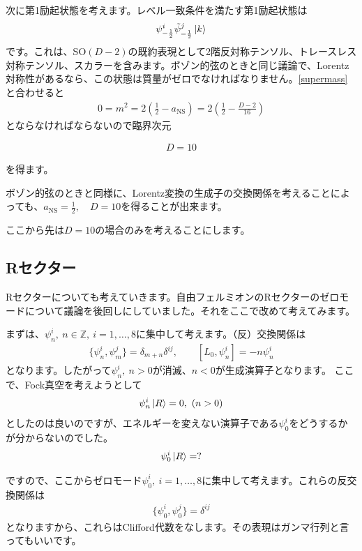\documentclass[report,paper=a4, fontsize=12pt, line_length=16cm, number_of_lines=33,dvipdfmx]{jlreq}
\newenvironment{important}{\begin{tcolorbox}[
  colback = white,
  colframe = red!35,
  boxrule = 2mm,
  fonttitle = \bfseries,
  after = \noindent] }{\end{tcolorbox}}
\numberwithin{equation}{chapter}
\numberwithin{equation}{section}
\newcommand{\Zb}{\mathbb{Z}}
\newcommand{\psit}{\tilde{\psi}}
\newcommand{\aNS}{a_{\mathrm{NS}}}
\begin{document}
次に第1励起状態を考えます。レベル一致条件を満たす第1励起状態は
\begin{align}
  \psi_{-\frac12}^{i}\psit_{-\frac12}^{j}\ket{k}
\end{align}
です。これは、SO$(D-2)$の既約表現として2階反対称テンソル、トレースレス対称テンソル、スカラーを含みます。ボゾン的弦のときと同じ議論で、Lorentz対称性があるなら、この状態は質量がゼロでなければなりません。\eqref{supermass}と合わせると
\begin{align}
  0=m^2=2(\frac12 -\aNS)=2(\frac12 -\frac{D-2}{16})
\end{align}
とならなければならないので臨界次元
\begin{important}
  \begin{align}
    D=10
  \end{align}
\end{important}
を得ます。

ボゾン的弦のときと同様に、Lorentz変換の生成子の交換関係を考えることによっても、$\aNS=\frac12,\quad D=10$を得ることが出来ます。

ここから先は$D=10$の場合のみを考えることにします。

\subsection{Rセクター}
Rセクターについても考えていきます。自由フェルミオンのRセクターのゼロモードについて議論を後回しにしていました。それをここで改めて考えてみます。

まずは、$\psi_{n}^{i},\ n\in \Zb,\ i=1,\dots,8$に集中して考えます。（反）交換関係は
\begin{align}
  \{\psi_{n}^{i},\psi_{m}^{j}\}=\delta_{m+n}\delta^{ij},\qquad
  [L_0,\psi^{i}_{n}]=-n\psi^{i}_{n}
\end{align}
となります。したがって$\psi^{i}_{n},\ n>0$が消滅、$n<0$が生成演算子となります。
ここで、Fock真空を考えようとして
\begin{align}
  \psi_{n}^{i}\ket{R}=0,\ (n>0)
\end{align}
としたのは良いのですが、エネルギーを変えない演算子である$\psi^{i}_{0}$をどうするかが分からないのでした。
\begin{align}
  \psi^{i}_{0}\ket{R}=?
\end{align}

ですので、ここからゼロモード$\psi^{i}_{0},\ i=1,\dots,8$に集中して考えます。これらの反交換関係は
\begin{align}
  \{\psi^{i}_{0},\psi^{j}_{0}\}=\delta^{ij}
\end{align}
となりますから、これらはClifford代数をなします。その表現はガンマ行列と言ってもいいです。
\end{document}
